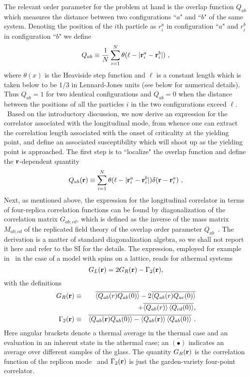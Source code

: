 \documentclass[9pt,twocolumn,twoside]{pnas-new}
\begin{document}
The relevant order parameter for the problem at hand is the overlap function $Q_{ab}$ which
measures the distance between two configurations ``$a$" and ``$b$" of the same system. Denoting the
position of the $i$th particle as $r_i^a$ in configuration ``$a$" and $r_i^b$ in configuration ``$b$"
we define
\begin{equation}
  Q_{ab} \equiv \frac{1}{N}\sum_{i=1}^N\theta(\ell-|{\bf r}_i^a-{\bf r}_i^b|)\ ,
  \label{defQ}
 \end{equation}
 where $\theta(x)$ is the Heaviside step function and $\ell$ is a constant length which is taken
 below to be 1/3 in Lennard-Jones units (see below for numerical details). Thus $Q_{ab}=1$ for two
 identical configurations and $Q_{ab}=0$ when the distance between the positions of all the particles
 $i$ in the two configurations exceed $\ell$.
\
 Based on the introductory discussion, we now derive an expression for the correlator associated with the longitudinal mode, from whence one can extract the correlation length associated with the onset of criticality at the yielding point, and define an associated susceptibility which will shoot up as the yielding point is approached. The first step is to ``localize" the overlap function and define the ${\bf r}$-dependent quantity
 \begin{equation}
  Q_{ab}({\bf r}) \equiv \sum_{i=1}^N\theta(\ell-|{\bf r}_i^a-{\bf r}_i^b|)\delta ({\bf r} -{\bf r}_i^a)\ ,
  \label{defQr}
 \end{equation}
Next, as mentioned above, the expression for the longitudinal correlator in terms of four-replica correlation functions can be found by diagonalization of the correlation matrix $G_{ab;cd}$, which is defined as the inverse of the mass matrix $M_{ab;cd}$ of the replicated field theory of the overlap order parameter $Q_{ab}$~\cite{98DKT}. The derivation is a matter of standard diagonalization algebra, so we shall not report it here and refer to the SI for the details. The expression, employed for example in~\cite{14BB1,14BB2} in the case of a model with spins on a lattice, reads for athermal systems
 \begin{equation}
  G_L({\bf r}) = 2G_R({\bf r}) - \Gamma_2({\bf r}),
 \end{equation}
 with the definitions
 \begin{eqnarray}
 G_R({\bf r}) &\equiv& \overline{\left<Q_{ab}(r)Q_{ab}(0)\right>} - 2\overline{\left<Q_{ab}(r)Q_{ac}(0)\right>}\\
 &&+ \overline{ \left<Q_{ab}(r)\right>\left<Q_{cd}(0)\right>},\nonumber\\
 \Gamma_2({\bf r}) &\equiv& \overline{\left<Q_{ab}({\bf r})Q_{ab}(0)\right> - \left<Q_{ab}({\bf r})\right>\left<Q_{ab}(0)\right>}\ .
 \end{eqnarray}
Here angular brackets denote a thermal average in the thermal case and an evaluation in an inherent state
in the athermal case; an $\overline{(\bullet)}$ indicates an average over different samples of the glass. The quantity $G_R({\bf r})$ is the correlation function of the replicon mode~\cite{98DKT} and $\Gamma_2({\bf r})$ is just the garden-variety four-point correlator.
\end{document}
